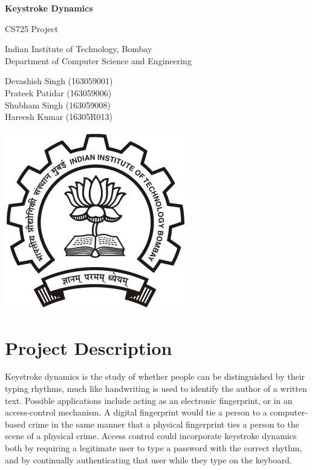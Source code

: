 \documentclass[a4paper,10pt]{article}
\begin{document}
\begin{titlepage}
\begin{center}
\vspace*{1cm}

\huge{\textbf{Keystroke Dynamics}}

\vspace{0.5cm}
CS725 Project

\vspace{3.5cm}
Indian Institute of Technology, Bombay\\
Department of Computer Science and Engineering
\vspace{3.5cm}

\Large{Devashish Singh (163059001) \\ Prateek Patidar (163059006) \\ Shubham Singh (163059008) \\ Hareesh Kumar (16305R013)}

\vfill

\vspace{0.8cm}

\includegraphics[scale=0.35]{IITB.png}
\end{center}
\end{titlepage}
 
\section{Project Description}
Keystroke dynamics is the study of whether people can be distinguished by their typing rhythms, much like handwriting is used to identify the author of a written text. Possible applications include acting as an electronic fingerprint, or in an access-control mechanism. A digital fingerprint would tie a person to a computer-based crime in the same manner that a physical fingerprint ties a person to the scene of a physical crime. Access control could incorporate keystroke dynamics both by requiring a legitimate user to type a password with the correct rhythm, and by continually authenticating that user while they type on the keyboard. 
\end{document}
